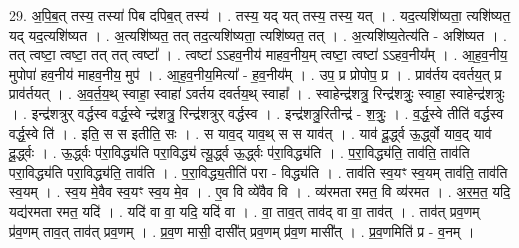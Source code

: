 \documentclass[17pt]{extarticle}
\begin{document}
29. अ॒पि॒ब॒त् तस्य॒ तस्या॑ पिब दपिब॒त् तस्य॑ । . तस्य॒ यद् यत् तस्य॒ तस्य॒ यत् । . यद॒त्यशि॑ष्यता॒ त्यशि॑ष्यत॒ यद् यद॒त्यशि॑ष्यत । . अ॒त्यशि॑ष्यत॒ तत् तद॒त्यशि॑ष्यता॒ त्यशि॑ष्यत॒ तत् । . अ॒त्यशि॑ष्य॒तेत्य॑ति - अशि॑ष्यत । . तत् त्वष्टा॒ त्वष्टा॒ तत् तत् त्वष्टा᳚ । . त्वष्टा॑ ऽऽहव॒नीय॑ माहव॒नीय॒म् त्वष्टा॒ त्वष्टा॑ ऽऽहव॒नीय᳚म् । . आ॒ह॒व॒नीय॒ मुपोपा॑ हव॒नीय॑ माहव॒नीय॒ मुप॑ । . आ॒ह॒व॒नीय॒मित्या᳚ - ह॒व॒नीय᳚म् । . उप॒ प्र प्रोपोप॒ प्र । . प्राव॑र्तय दवर्तय॒त् प्र प्राव॑र्तयत् । . अ॒व॒र्त॒य॒थ् स्वाहा॒ स्वाहा॑ ऽवर्तय दवर्तय॒थ् स्वाहा᳚ । . स्वाहेन्द्र॑शत्रु॒ रिन्द्र॑शत्रुः॒ स्वाहा॒ स्वाहेन्द्र॑शत्रुः । . इन्द्र॑शत्रुर् वर्द्धस्व वर्द्ध॒स्वे न्द्र॑शत्रु॒ रिन्द्र॑शत्रुर् वर्द्धस्व । . इन्द्र॑शत्रु॒रितीन्द्र॑ - श॒त्रुः॒ । . व॒र्द्ध॒स्वे तीति॑ वर्द्धस्व वर्द्ध॒स्वे ति॑ । . इति॒ स स इतीति॒ सः । . स याव॒द् याव॒थ् स स याव॑त् । . याव॑ दू॒र्द्ध्व ऊ॒र्द्ध्वो याव॒द् याव॑ दू॒र्द्ध्वः । . ऊ॒र्द्ध्वः प॑रा॒विद्ध्य॑ति परा॒विद्ध्य॑ त्यू॒र्द्ध्व ऊ॒र्द्ध्वः प॑रा॒विद्ध्य॑ति । . प॒रा॒विद्ध्य॑ति॒ ताव॑ति॒ ताव॑ति परा॒विद्ध्य॑ति परा॒विद्ध्य॑ति॒ ताव॑ति । . प॒रा॒विद्ध्य॒तीति॑ परा - विद्ध्य॑ति । . ताव॑ति स्व॒यꣳ स्व॒यम् ताव॑ति॒ ताव॑ति स्व॒यम् । . स्व॒य मे॒वैव स्व॒यꣳ स्व॒य मे॒व । . ए॒व वि व्ये॑वैव वि । . व्य॑रमता रमत॒ वि व्य॑रमत । . अ॒र॒म॒त॒ यदि॒ यद्य॑रमता रमत॒ यदि॑ । . यदि॑ वा वा॒ यदि॒ यदि॑ वा । . वा॒ ताव॒त् ताव॑द् वा वा॒ ताव॑त् । . ताव॑त् प्रव॒णम् प्र॑व॒णम् ताव॒त् ताव॑त् प्रव॒णम् । . प्र॒व॒ण मासी॒ दासी᳚त् प्रव॒णम् प्र॑व॒ण मासी᳚त् । . प्र॒व॒णमिति॑ प्र - व॒नम् । \newline
\end{document}
